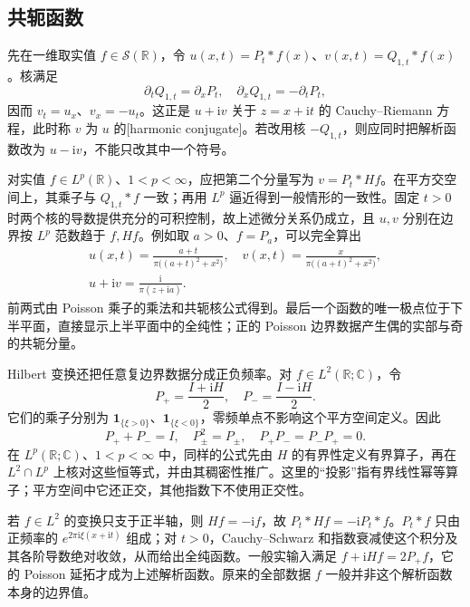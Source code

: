 \subsection{共轭函数}
\label{b2:subsec:180502}

先在一维取实值 \(f\in\mathcal S(\mathbb R)\)，令 \(u(x,t)=P_t*f(x)\)、\(v(x,t)=Q_{1,t}*f(x)\)。核满足
\[
 \partial_tQ_{1,t}=\partial_xP_t,
 \quad \partial_xQ_{1,t}=-\partial_tP_t,
\]
因而 \(v_t=u_x\)、\(v_x=-u_t\)。这正是 \(u+\mathrm iv\) 关于 \(z=x+\mathrm it\) 的 Cauchy--Riemann 方程，此时称 \(v\) 为 \(u\) 的[harmonic conjugate]。若改用核 \(-Q_{1,t}\)，则应同时把解析函数改为 \(u-\mathrm iv\)，不能只改其中一个符号。

\ProseParagraphBreak

对实值 \(f\in L^p(\mathbb R)\)、\(1<p<\infty\)，应把第二个分量写为 \(v=P_t*Hf\)。在平方交空间上，其乘子与 \(Q_{1,t}*f\) 一致；再用 \(L^p\) 逼近得到一般情形的一致性。固定 \(t>0\) 时两个核的导数提供充分的可积控制，故上述微分关系仍成立，且 \(u,v\) 分别在边界按 \(L^p\) 范数趋于 \(f,Hf\)。例如取 \(a>0\)、\(f=P_a\)，可以完全算出
\[
 \begin{gathered}
 u(x,t)=\frac{a+t}{\pi\bigl((a+t)^2+x^2\bigr)},
 \quad v(x,t)=\frac{x}{\pi\bigl((a+t)^2+x^2\bigr)},\\
 u+\mathrm iv=\frac{\mathrm i}{\pi(z+\mathrm ia)}.
 \end{gathered}
\]
前两式由 Poisson 乘子的乘法和共轭核公式得到。最后一个函数的唯一极点位于下半平面，直接显示上半平面中的全纯性；正的 Poisson 边界数据产生偶的实部与奇的共轭分量。

\ProseParagraphBreak

Hilbert 变换还把任意复边界数据分成正负频率。对 \(f\in L^2(\mathbb R;\mathbb C)\)，令
\[
 P_+=\frac{I+\mathrm iH}{2},\quad P_-=\frac{I-\mathrm iH}{2}.
\]
它们的乘子分别为 \(\mathbf1_{\{\xi>0\}}\)、\(\mathbf1_{\{\xi<0\}}\)，零频单点不影响这个平方空间定义。因此
\[
 P_++P_-=I,\quad P_\pm^2=P_\pm,\quad P_+P_-=P_-P_+=0.
\]
在 \(L^p(\mathbb R;\mathbb C)\)、\(1<p<\infty\) 中，同样的公式先由 \(H\) 的有界性定义有界算子，再在 \(L^2\cap L^p\) 上核对这些恒等式，并由其稠密性推广。这里的“投影”指有界线性幂等算子；平方空间中它还正交，其他指数下不使用正交性。

\ProseParagraphBreak

若 \(f\in L^2\) 的变换只支于正半轴，则 \(Hf=-\mathrm if\)，故 \(P_t*Hf=-\mathrm iP_t*f\)。\(P_t*f\) 只由正频率的 \(e^{2\pi\mathrm i\xi(x+\mathrm it)}\) 组成；对 \(t>0\)，Cauchy--Schwarz 和指数衰减使这个积分及其各阶导数绝对收敛，从而给出全纯函数。一般实输入满足 \(f+\mathrm iHf=2P_+f\)，它的 Poisson 延拓才成为上述解析函数。原来的全部数据 \(f\) 一般并非这个解析函数本身的边界值。

